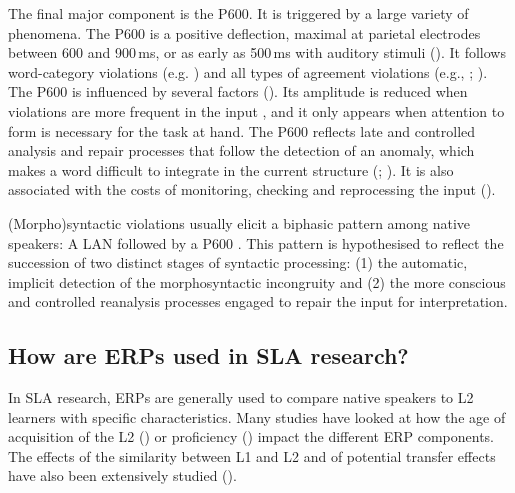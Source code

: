 \documentclass[output=paper,colorlinks,citecolor=brown,modfonts,nonflat]{../langscibook}
\begin{document}
The final major component is the P600. It is triggered by a large variety of phenomena. The P600 is a positive deflection, maximal at parietal electrodes between 600 and 900\,ms, or as early as 500\,ms with auditory stimuli (\citealt{OsterhoutHolcomb1992,QiEtAl2017}). It follows word-category violations (e.g. \citealt{Friederici2002,PakulakNeville2010,BatterinkNeville2013,BowdenEtAl2013}) and all types of agreement violations (e.g., \citealt{TokowiczMacWhinney2005,OsterhoutEtAl2006,Gillon-DowensEtAl2011,BatterinkNeville2013,TannerEtAl2014}; \citealt{Alemán-BañónEtAl2017}). The P600 is influenced by several factors (\citealt{Morgan-ShortEtAl2015}). Its amplitude is reduced when violations are more frequent in the input \citep{SassenhagenEtAl2014}, and it only appears when attention to form is necessary for the task at hand. The P600 reflects late and controlled analysis and repair processes that follow the detection of an anomaly, which makes a word difficult to integrate in the current structure (\citealt{Friederici2002,Kaan2007,CaffarraEtAl2015}; \citealt{Morgan-ShortEtAl2015}). It is also associated with the costs of monitoring, checking and reprocessing the input (\citealt{MeerendonkEtAl2009}).

(Morpho)syntactic violations usually elicit a biphasic pattern among native speakers: A LAN followed by a P600 \citep{Friederici2002}. This pattern is hypothesised to reflect the succession of two distinct stages of syntactic processing:
(1) the automatic, implicit detection of the morphosyntactic incongruity and
(2) the more conscious and controlled reanalysis processes engaged to repair the input for interpretation.

\subsection{How are ERPs used in SLA research?}

In SLA research, ERPs are generally used to compare native speakers to L2 learners with specific characteristics. Many studies have looked at how the age of acquisition of the L2 (\citealt{Weber-FoxNeville1996,HakutaEtAl2003}) or proficiency (\citealt{OjimaEtAl2005,RossiEtAl2006,SteinhauerEtAl2009,TannerEtAl2009,TannerEtAl2013,TannerEtAl2014,McLaughlinEtAl2010}) impact the different ERP components. The effects of the similarity between L1 and L2 and of potential transfer effects have also been extensively studied (\citealt{TokowiczMacWhinney2005,ChenEtAl2007,FoucartFrenck-Mestre2010,FoucartFrenck-Mestre2012,Gillon-DowensEtAl2010}).
\end{document}
